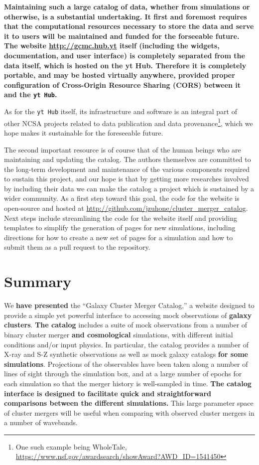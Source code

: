 \documentclass{emulateapj}
\newcommand{\code}[1]{\texttt{#1}}
\begin{document}
{\bf Maintaining such a large catalog of data, whether from simulations or otherwise, is a substantial undertaking. It first and foremost requires that the computational resources necessary to store the data and serve it to users will be maintained and funded for the forseeable future. The website \url{http://gcmc.hub.yt} itself (including the widgets, documentation, and user interface) is completely separated from the data itself, which is hosted on the yt Hub. Therefore it is completely portable, and may be hosted virtually anywhere, provided proper configuration of Cross-Origin Resource Sharing (CORS) between it and the \code{yt Hub}.

As for the \code{yt Hub} itself, its infrastructure and software is an integral part of other NCSA projects related to data publication and data provenance\footnote{One such example being WholeTale, \url{https://www.nsf.gov/awardsearch/showAward?AWD_ID=1541450}}, which we hope makes it sustainable for the foreseeable future.

The second important resource is of course that of the human beings who are maintaining and updating the catalog. The authors themselves are committed to the long-term development and maintenance of the various components required to sustain this project, and our hope is that by getting more researches involved by including their data we can make the catalog a project which is sustained by a wider community. As a first step toward this goal, the code for the website is open-source and hosted at \url{http://github.com/jzuhone/cluster_merger_catalog}. Next steps include streamlining the code for the website itself and providing templates to simplify the generation of pages for new simulations, including directions for how to create a new set of pages for a simulation and how to submit them as a pull request to the repository.} 

\section{Summary}\label{sec:summary}

We {\bf have presented} the ``Galaxy Cluster Merger Catalog,'' a website designed to provide a simple yet powerful interface to accessing mock observations of {\bf galaxy clusters}. {\bf The catalog} includes a suite of mock observations from a number of binary cluster merger {\bf and cosmological} simulations, with different initial conditions and/or input physics. In particular, the catalog provides a number of X-ray and S-Z synthetic observations as well as mock galaxy catalogs {\bf for some simulations}. Projections of the observables have been taken along a number of lines of sight through the simulation box, and at a large number of epochs for each simulation so that the merger history is well-sampled in time. {\bf The catalog interface is designed to facilitate quick and straightforward comparisons between the different simulations.} This large parameter space of cluster mergers will be useful when comparing with observed cluster mergers in a number of wavebands.
\end{document}
